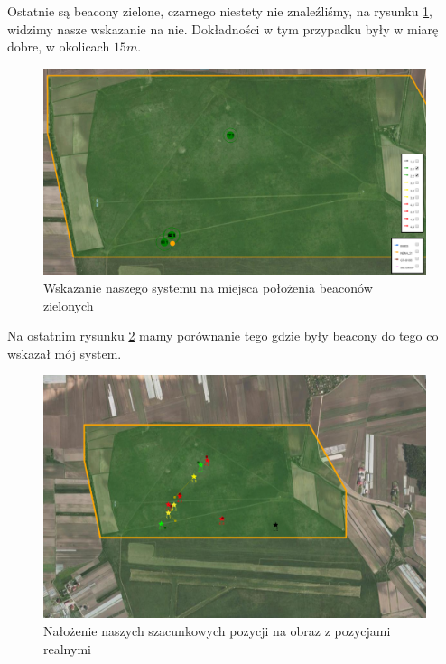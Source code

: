Ostatnie są beacony zielone, czarnego niestety nie znaleźliśmy, na rysunku \ref{fig:wskazaniezielone}, widzimy nasze wskazanie na nie. Dokładności w tym przypadku były w miarę dobre, w okolicach $15 m$.

\begin{figure}[!th]
    \centering
    \includegraphics[width=15cm]{zalaczniki/obrazy/wskazanie_zielone.png}
    \caption{Wskazanie naszego systemu na miejsca położenia beaconów zielonych}
    \label{fig:wskazaniezielone}
\end{figure}

Na ostatnim rysunku \ref{fig:beaconykonkursowenasze} mamy porównanie tego gdzie były beacony do tego co wskazał mój system.

\begin{figure}[!th]
    \centering
    \includegraphics[width=15cm]{zalaczniki/obrazy/beacony_konkursowe_nasze.png}
    \caption{Nałożenie naszych szacunkowych pozycji na obraz z pozycjami realnymi}
    \label{fig:beaconykonkursowenasze}
\end{figure}


